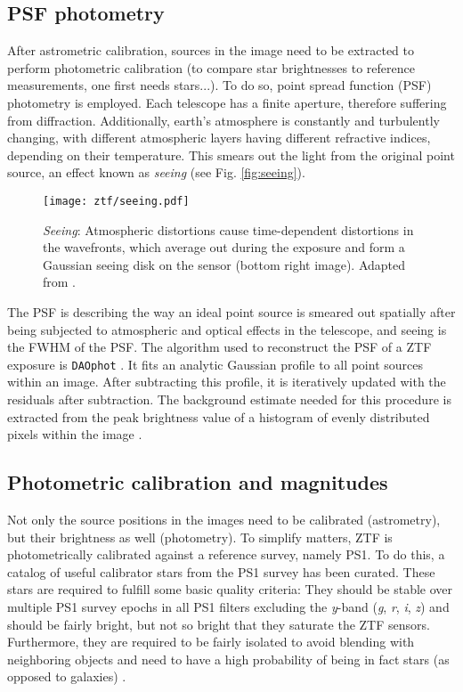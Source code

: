 \subsection{PSF photometry} \label{psfphot}
After astrometric calibration, sources in the image need to be extracted to perform photometric calibration (to compare star brightnesses to reference measurements, one first needs stars...). To do so, point spread function (PSF) photometry is employed. Each telescope has a finite aperture, therefore suffering from diffraction. Additionally, earth's atmosphere is constantly and turbulently changing, with different atmospheric layers having different refractive indices, depending on their temperature. This smears out the light from the original point source, an effect known as \textit{seeing} (see Fig. \ref{fig:seeing}).

\begin{figure}[h!]
    \texttt{[image: ztf/seeing.pdf]}
    \caption[Seeing]{\textit{Seeing}: Atmospheric distortions cause time-dependent distortions in the wavefronts, which average out during the exposure and form a Gaussian seeing disk on the sensor (bottom right image). Adapted from \cite{Chromey2016}.}
\end{figure}

The PSF is describing the way an ideal point source is smeared out spatially after being subjected to atmospheric and optical effects in the telescope, and seeing is the FWHM of the PSF. The algorithm used to reconstruct the PSF of a ZTF exposure is \texttt{DAOphot} . It fits an analytic Gaussian profile to all point sources within an image. After subtracting this profile, it is iteratively updated with the residuals after subtraction. The background estimate needed for this procedure is extracted from the peak brightness value of a histogram of evenly distributed pixels within the image \cite{Stetson1987}.

\subsection{Photometric calibration and magnitudes}
Not only the source positions in the images need to be calibrated (astrometry), but their brightness as well (photometry). To simplify matters, ZTF is photometrically calibrated against a reference survey, namely PS1. To do this, a catalog of useful calibrator stars from the PS1 survey has been curated. These stars are required to fulfill some basic quality criteria: They should be stable over multiple PS1 survey epochs in all PS1 filters excluding the \textit{y}-band (\textit{g}, \textit{r}, \textit{i}, \textit{z}) and should be fairly bright, but not so bright that they saturate the ZTF sensors. Furthermore, they are required to be fairly isolated to avoid blending with neighboring objects and need to have a high probability of being in fact stars (as opposed to galaxies) \cite{Masci2019a}.

